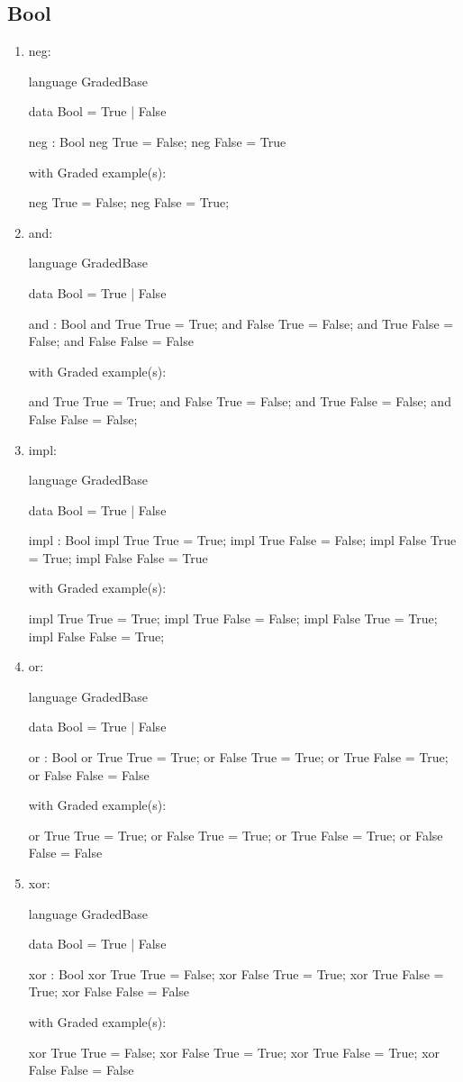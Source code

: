 \subsection{Bool}
\begin{enumerate}
\item neg: 
\begin{granule}
language GradedBase

data Bool = True | False

neg : Bool %
neg True = False;
neg False = True
\end{granule}
with Graded example(s):
\begin{granule}
neg True = False;
neg False = True;
\end{granule}
\item and: 
\begin{granule}
language GradedBase

data Bool = True | False

and : Bool %
and True True = True;
and False True = False;
and True False = False;
and False False = False
\end{granule}
with Graded example(s):
\begin{granule}
and True True = True;
and False True = False;
and True False = False;
and False False = False;
\end{granule}
\item impl: 
\begin{granule}
language GradedBase

data Bool = True | False

impl : Bool %
impl True True = True;
impl True False = False;
impl False True = True;
impl False False = True
\end{granule}
with Graded example(s):
\begin{granule}
impl True True = True;
impl True False = False;
impl False True = True;
impl False False = True;
\end{granule}
\item or: 
\begin{granule}
language GradedBase

data Bool = True | False

or : Bool %
or True True = True;
or False True = True;
or True False = True;
or False False = False
\end{granule}
with Graded example(s):
\begin{granule}
or True True = True;
or False True = True;
or True False = True;
or False False = False
\end{granule}
\item xor: 
\begin{granule}
language GradedBase

data Bool = True | False

xor : Bool %
xor True True = False;
xor False True = True;
xor True False = True;
xor False False = False
\end{granule}
with Graded example(s):
\begin{granule}
xor True True = False;
xor False True = True;
xor True False = True;
xor False False = False
\end{granule}
\end{enumerate}
